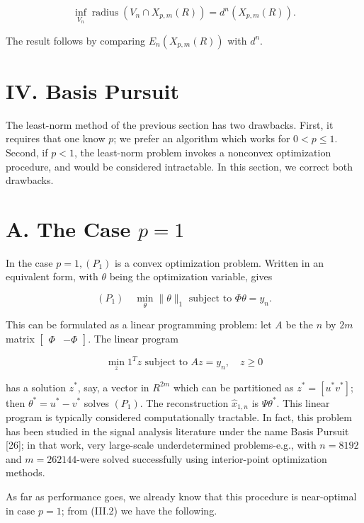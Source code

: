 \documentclass[10pt]{article}
\begin{document}
$$
\inf _{V_{n}} \operatorname{radius}\left(V_{n} \cap X_{p, m}(R)\right)=d^{n}\left(X_{p, m}(R)\right) .
$$

The result follows by comparing $E_{n}\left(X_{p, m}(R)\right)$ with $d^{n}$.

\section*{IV. Basis Pursuit}
The least-norm method of the previous section has two drawbacks. First, it requires that one know $p$; we prefer an algorithm which works for $0<p \leq 1$. Second, if $p<1$, the least-norm problem invokes a nonconvex optimization procedure, and would be considered intractable. In this section, we correct both drawbacks.

\section*{A. The Case $p=1$}
In the case $p=1,\left(P_{1}\right)$ is a convex optimization problem. Written in an equivalent form, with $\theta$ being the optimization variable, gives

$$
\left(P_{1}\right) \quad \min _{\theta}\|\theta\|_{1} \text { subject to } \Phi \theta=y_{n} .
$$

This can be formulated as a linear programming problem: let $A$ be the $n$ by $2 m$ matrix $\left[\begin{array}{ll}\Phi & -\Phi\end{array}\right]$. The linear program


\begin{equation*}
\min _{z} 1^{T} z \text { subject to } A z=y_{n}, \quad z \geq 0 \tag{LP}
\end{equation*}


has a solution $z^{*}$, say, a vector in $R^{2 m}$ which can be partitioned as $z^{*}=\left[u^{*} v^{*}\right]$; then $\theta^{*}=u^{*}-v^{*}$ solves $\left(P_{1}\right)$. The reconstruction $\hat{x}_{1, n}$ is $\Psi \theta^{*}$. This linear program is typically considered computationally tractable. In fact, this problem has been studied in the signal analysis literature under the name Basis Pursuit [26]; in that work, very large-scale underdetermined problems-e.g., with $n=8192$ and $m=262144$-were solved successfully using interior-point optimization methods.

As far as performance goes, we already know that this procedure is near-optimal in case $p=1$; from (III.2) we have the following.
\end{document}
